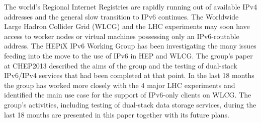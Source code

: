 The world's Regional Internet Registries are rapidly running out of available IPv4 addresses and the 
general slow transition to IPv6 continues. The Worldwide Large Hadron Collider Grid (WLCG) and the LHC experiments 
may soon have access to worker nodes or virtual machines possessing only an IPv6-routable address. The HEPiX
IPv6 Working Group \cite{ipv6wg} has been investigating the many issues feeding into the move to the use of IPv6 in HEP and WLCG.
The group's paper at CHEP2013 \cite{ipv6chep2013} described the aims of the group and the testing of dual-stack IPv6/IPv4 
services that had been completed at that point. In the last 18 months the group has worked more closely with the
4 major LHC experiments and identified the main use case for the support of IPv6-only clients on WLCG. The group's
activities, including testing of dual-stack data storage services, during the last 18 months are presented in this 
paper together with its future plans.